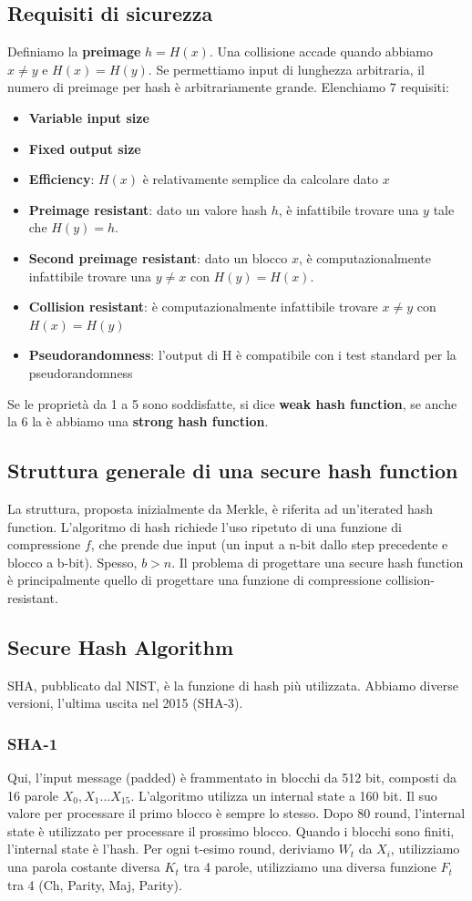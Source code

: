 \documentclass[11pt]{article}
\begin{document}
\subsection{Requisiti di sicurezza}
Definiamo la \textbf{preimage} $h=H(x)$. Una collisione accade quando abbiamo $x \neq y$ e $H(x)=H(y)$. Se permettiamo input di lunghezza arbitraria, il numero di preimage per hash è arbitrariamente grande.
Elenchiamo 7 requisiti:
\begin{itemize}
    \item \textbf{Variable input size}
    \item \textbf{Fixed output size}
    \item \textbf{Efficiency}: $H(x)$ è relativamente semplice da calcolare dato $x$
    \item \textbf{Preimage resistant}: dato un valore hash $h$, è infattibile trovare una $y$ tale che $H(y)=h$.
    \item \textbf{Second preimage resistant}: dato un blocco $x$, è computazionalmente infattibile trovare una $y \neq x$ con $H(y)=H(x)$.
    \item \textbf{Collision resistant}: è computazionalmente infattibile trovare $x \neq y$ con $H(x) = H(y)$
    \item \textbf{Pseudorandomness}: l'output di H è compatibile con i test standard per la pseudorandomness
\end{itemize}
Se le proprietà da 1 a 5 sono soddisfatte, si dice \textbf{weak hash function}, se anche la 6 la è abbiamo una \textbf{strong hash function}.
\subsection{Struttura generale di una secure hash function}
La struttura, proposta inizialmente da Merkle, è riferita ad un'iterated hash function. L'algoritmo di hash richiede l'uso ripetuto di una funzione di compressione $f$, che prende due input (un input a n-bit dallo step precedente e blocco a b-bit). Spesso, $b>n$. Il problema di progettare una secure hash function è principalmente quello di progettare una funzione di compressione collision-resistant.
\subsection{Secure Hash Algorithm}
SHA, pubblicato dal NIST, è la funzione di hash più utilizzata. Abbiamo diverse versioni, l'ultima uscita nel 2015 (SHA-3).
\subsubsection{SHA-1}
Qui, l'input message (padded) è frammentato in blocchi da 512 bit, composti da 16 parole $X_0,X_1...X_{15}$. L'algoritmo utilizza un internal state a 160 bit. Il suo valore per processare il primo blocco è sempre lo stesso. Dopo 80 round, l'internal state è utilizzato per processare il prossimo blocco. Quando i blocchi sono finiti, l'internal state è l'hash. Per ogni t-esimo round, deriviamo $W_t$ da $X_i$, utilizziamo una parola costante diversa $K_t$ tra 4 parole, utilizziamo una diversa funzione $F_t$ tra 4 (Ch, Parity, Maj, Parity). 
\end{document}
